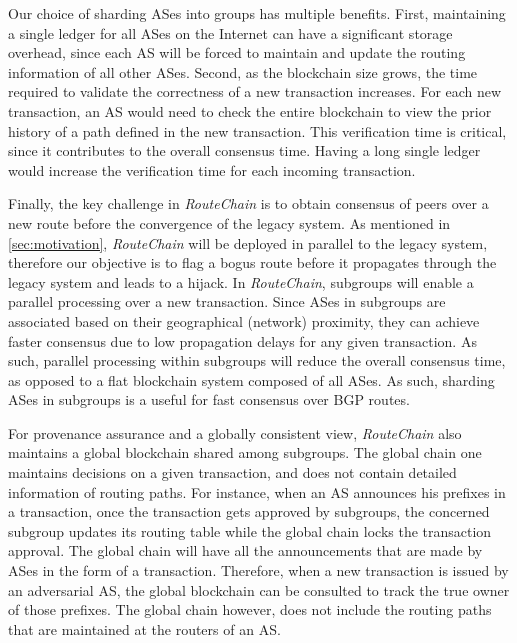 \documentclass[conference]{IEEEtran}
\newcommand{\rc}{{{\em RouteChain}}\xspace}
\begin{document}
Our choice of sharding ASes into groups has multiple benefits. First, maintaining a single ledger for all ASes on the Internet can have a significant storage overhead, since each AS will be forced to maintain and update the routing information of all other ASes.  %
Second, as the blockchain size grows, the time required to validate the correctness of a new transaction increases. For each new transaction, an AS would need to check the entire blockchain to view the prior history of a path defined in the new transaction. This verification time is critical, since it contributes to the overall consensus time. Having a long single ledger would increase the verification time for each incoming transaction. 

Finally, the key challenge in \rc is to obtain consensus of peers over a new route before the convergence of the legacy system. As mentioned in \textsection\ref{sec:motivation}, \rc will be deployed in parallel to the legacy system, therefore our objective is to flag a bogus route before it propagates through the legacy system and leads to a hijack. In \rc, subgroups will enable a parallel processing over a new transaction. Since ASes in subgroups are associated based on their geographical (network) proximity, they can achieve faster consensus due to low propagation delays for any given transaction. As such, parallel processing within subgroups will reduce the overall consensus time, as opposed to a flat blockchain system composed of all ASes. As such, sharding ASes in subgroups is a useful for fast consensus over BGP routes. 

For provenance assurance and a globally consistent view, \rc also maintains a global blockchain shared among subgroups. The global chain one maintains decisions on a given transaction, and does not contain detailed information of routing paths. For instance, when an AS announces his prefixes in a transaction, once the transaction gets approved by subgroups, the concerned subgroup updates its routing table while the global chain locks the transaction approval. The global chain will have all the announcements that are made by ASes in the form of a transaction. Therefore, when a new transaction is issued by an adversarial AS, the global blockchain can be consulted to track the true owner of those prefixes. The global chain however, does not include the routing paths that are maintained at the routers of an AS. 
\end{document}

